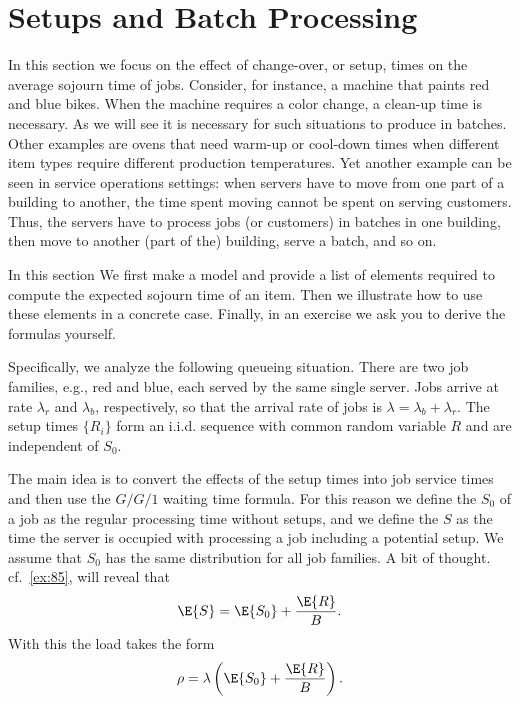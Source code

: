 \section{Setups and Batch Processing}
\label{sec:setups-batch-proc}



In this section we focus on the effect of change-over, or setup, times on the average sojourn time of jobs.
Consider, for instance, a machine that paints red and blue bikes.
When the machine requires a color change, a clean-up time is necessary.
As we will see it is necessary for such situations to produce in batches.
Other examples are ovens that need warm-up or cool-down times when different item types require different production temperatures.
Yet another example can be seen in service operations settings: when servers have to move from one part of a building to another, the time spent moving cannot be spent on serving customers.
Thus, the servers have to process jobs (or customers) in batches in one building, then move to another (part of the) building, serve a batch, and so on.

In this section We first make a model and provide a list of elements required to compute the expected sojourn time of an item.
Then we illustrate how to use these elements in a concrete case.
Finally, in an exercise we ask you to derive the formulas yourself.


Specifically, we analyze the following queueing situation.
There are two job families, e.g., red and blue, each served by the same single server.
Jobs arrive at rate $\lambda_r$ and $\lambda_b$, respectively, so that the arrival rate of jobs is $\lambda= \lambda_b+\lambda_r$.
The setup times $\{R_i\}$ form an i.i.d.
sequence with common random variable $R$ and are independent of $S_0$.

The main idea is to convert the effects of the setup times into job service times and then use the $G/G/1$ waiting time formula.
For this reason we define the  $S_0$ of a job as the regular processing time without setups, and we define the  $S$ as the time the server is occupied with processing a job including a potential setup.
We assume that $S_0$ has the same distribution for all job families.
A bit of thought. cf.~\cref{ex:85}, will reveal that 
\begin{equation}\label{eq:81}
    \E{S} = \E{S_0} + \frac{\E{R}} B.
\end{equation}
With this the load takes the form
\begin{equation*}
\rho = \lambda \left(\E{S_0} + \frac{\E{R}}B\right).
\end{equation*}

